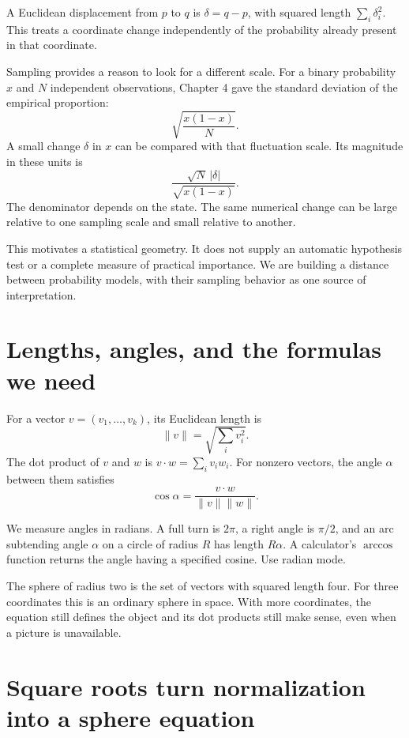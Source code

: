 \documentclass[11pt,oneside,openany]{book}
\theoremstyle{definition}
\theoremstyle{remark}
\numberwithin{equation}{chapter}
\begin{document}
A Euclidean displacement from \(p\) to \(q\) is \(\delta=q-p\), with squared length \(\sum_i\delta_i^2\). This treats a coordinate change independently of the probability already present in that coordinate.

Sampling provides a reason to look for a different scale. For a binary probability \(x\) and \(N\) independent observations, Chapter 4 gave the standard deviation of the empirical proportion: \[\sqrt{\frac{x(1-x)}N}.\] A small change \(\delta\) in \(x\) can be compared with that fluctuation scale. Its magnitude in these units is \[\frac{\sqrt N\,|\delta|}{\sqrt{x(1-x)}}.\] The denominator depends on the state. The same numerical change can be large relative to one sampling scale and small relative to another.

This motivates a statistical geometry. It does not supply an automatic hypothesis test or a complete measure of practical importance. We are building a distance between probability models, with their sampling behavior as one source of interpretation.

\section{Lengths, angles, and the formulas we need}\label{ch07-lengths-angles-and-the-formulas-we-need}

For a vector \(v=(v_1,\ldots,v_k)\), its Euclidean length is \[\|v\|=\sqrt{\sum_i v_i^2}.\] The dot product of \(v\) and \(w\) is \(v\cdot w=\sum_i v_iw_i\). For nonzero vectors, the angle \(\alpha\) between them satisfies \[\cos\alpha=\frac{v\cdot w}{\|v\|\|w\|}.\]

We measure angles in radians. A full turn is \(2\pi\), a right angle is \(\pi/2\), and an arc subtending angle \(\alpha\) on a circle of radius \(R\) has length \(R\alpha\). A calculator's \(\arccos\) function returns the angle having a specified cosine. Use radian mode.

The sphere of radius two is the set of vectors with squared length four. For three coordinates this is an ordinary sphere in space. With more coordinates, the equation still defines the object and its dot products still make sense, even when a picture is unavailable.

\section{Square roots turn normalization into a sphere equation}\label{ch07-square-roots-turn-normalization-into-a-sphere-equation}
\end{document}
